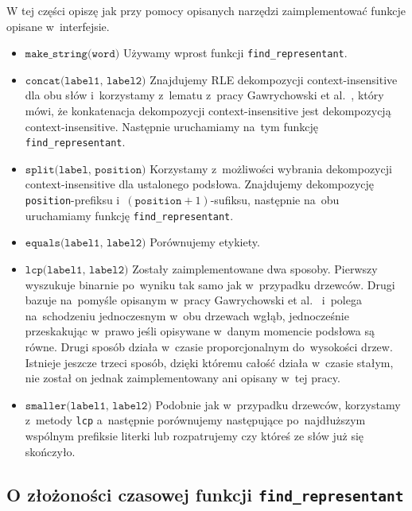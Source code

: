 \documentclass[declaration,shortabstract]{iithesis}
\theoremstyle{definition} \newtheorem{definition}{Definicja}[chapter]
\theoremstyle{plain} \newtheorem{remark}[definition]{Obserwacja}
\theoremstyle{plain} \newtheorem{theorem}[definition]{Twierdzenie}
\theoremstyle{plain} \newtheorem{example}{Przykład}[definition]
\theoremstyle{plain} \newtheorem{lemma}[definition]{Lemat}
\begin{document}
W tej części opiszę jak przy pomocy opisanych narzędzi zaimplementować funkcje opisane w~interfejsie.
\begin{itemize}
    \item $\texttt{make\_string(word)}$ Używamy wprost funkcji \texttt{find\_representant}.
    \item $\texttt{concat(label1, label2)}$ Znajdujemy RLE dekompozycji context-insensitive dla obu słów i~korzystamy z~lematu z~pracy Gawrychowski et al.~\cite{gawrychowski}, który mówi, że konkatenacja dekompozycji context-insensitive jest dekompozycją context-insensitive. Następnie uruchamiamy na~tym funkcję \texttt{find\_representant}.
    \item $\texttt{split(label, position)}$ Korzystamy z~możliwości wybrania dekompozycji context-insensitive dla ustalonego podsłowa. Znajdujemy dekompozycję \texttt{position}-prefiksu i~$(\texttt{position} + 1)$-sufiksu, następnie na~obu uruchamiamy funkcję \texttt{find\_representant}. 
    \item $\texttt{equals(label1, label2)}$ Porównujemy etykiety.
    \item $\texttt{lcp(label1, label2)}$ Zostały zaimplementowane dwa sposoby. Pierwszy wyszukuje binarnie po~wyniku tak samo jak w~przypadku drzewców. Drugi bazuje na~pomyśle opisanym w~pracy Gawrychowski et al.~\cite{gawrychowski} i~polega na~schodzeniu jednoczesnym w~obu drzewach wgłąb, jednocześnie przeskakując w~prawo jeśli opisywane w~danym momencie podsłowa są równe. Drugi sposób działa w~czasie proporcjonalnym do~wysokości drzew. Istnieje jeszcze trzeci sposób, dzięki któremu całość działa w~czasie stałym, nie został on jednak zaimplementowany ani opisany w~tej pracy.
    \item $\texttt{smaller(label1, label2)}$ Podobnie jak w~przypadku drzewców, korzystamy z~metody \texttt{lcp} a~następnie porównujemy następujące po~najdłuższym wspólnym prefiksie literki lub rozpatrujemy czy któreś ze słów już się skończyło. 
\end{itemize}


\subsection{O złożoności czasowej funkcji \texttt{find\_representant}}
\end{document}
